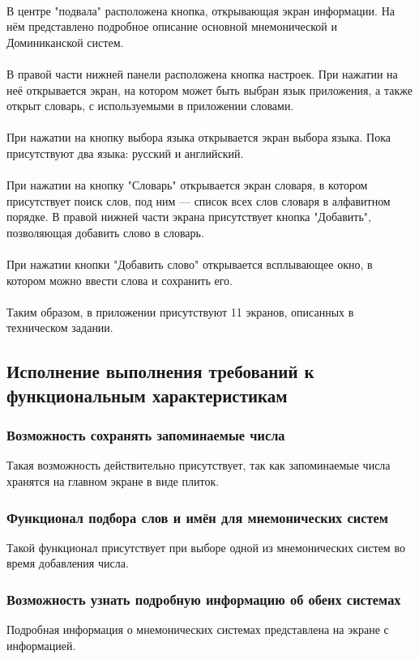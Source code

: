 \documentclass[draft]{article}
\begin{document}
~\\
В центре "{}подвала"{} расположена кнопка, открывающая экран информации. На нём представлено подробное описание основной мнемонической и Доминиканской систем.\\
~\\
В правой части нижней панели расположена кнопка настроек. При нажатии на неё открывается экран, на котором может быть выбран язык приложения, а также открыт словарь, с используемыми в приложении словами.\\
~\\
При нажатии на кнопку выбора языка открывается экран выбора языка. Пока присутствуют два языка: русский и английский.\\
~\\
При нажатии на кнопку "{}Словарь"{} открывается экран словаря, в котором присутствует поиск слов, под ним — список всех слов словаря в алфавитном
порядке. В правой нижней части экрана присутствует кнопка "Добавить", позволяющая добавить слово в словарь.\\
~\\
При нажатии кнопки "{}Добавить слово"{} открывается всплывающее окно, в котором можно ввести слова и сохранить его.\\
~\\
Таким образом, в приложении присутствуют 11 экранов, описанных в техническом задании.
\subsection{Исполнение выполнения требований к функциональным характеристикам}
\subsubsection{Возможность сохранять запоминаемые числа}
Такая возможность действительно присутствует, так как запоминаемые числа хранятся на главном экране в виде плиток.
\subsubsection{Функционал подбора слов и имён для мнемонических систем}
Такой функционал присутствует при выборе одной из мнемонических систем во время добавления числа.
\subsubsection{Возможность узнать подробную информацию об обеих системах}
Подробная информация о мнемонических системах представлена на экране с информацией.
\end{document}

